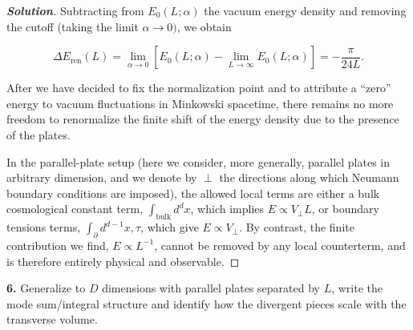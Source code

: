 \documentclass[11pt]{article}
\newenvironment{solution}[1][]{\begin{proof}[\textbf{Solution}]}{\end{proof}}
\begin{document}
\begin{solution}[17.5]
	Subtracting from $E_0(L;\alpha)$ the vacuum energy density and removing the cutoff (taking the limit $\alpha\to0)$, we obtain
	
	$$\Delta E_{\mathrm{ren}}(L)=\lim_{\alpha\to0}\left[E_0\left(L;\alpha\right)-\lim_{L\to\infty}E_0\left(L;\alpha\right)\right]=-\frac\pi{24L}.$$
	
	After we have decided to fix the normalization point and to attribute a “zero” energy to vacuum fluctuations in Minkowski spacetime, there remains no more freedom to renormalize the finite shift of the energy density due to the presence of the plates. 
	
	In the parallel-plate setup (here we consider, more generally, parallel plates in arbitrary dimension, and we denote by $\perp$ the directions along which Neumann boundary conditions are imposed), the allowed local terms are either a bulk cosmological constant term, $\int_{\mathrm{bulk}} d^{d}x$, which implies $E \propto V_\perp L$, or boundary tensions terms, $\int_{\partial} d^{d-1}x,\tau$, which give $E \propto V_\perp$. By contrast, the finite contribution we find, $E \propto L^{-1}$, cannot be removed by any local counterterm, and is therefore entirely physical and observable.
\end{solution}
\begin{tcolorbox}[problem]
\textbf{6.} Generalize to $D$ dimensions with parallel plates separated by $L$, write the mode sum/integral structure and identify how the divergent pieces scale with the transverse volume.
\end{tcolorbox}
\end{document}
